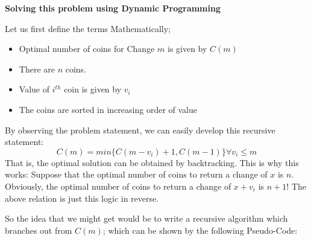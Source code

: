 \documentclass{article}
\theoremstyle{definition}
\theoremstyle{example}
\begin{document}
\noindent \textbf{Solving this problem using Dynamic Programming} \par
\noindent Let us first define the terms Mathematically;
\begin{itemize}
    \item Optimal number of coins for Change $m$ is given by $C(m)$
    \item There are $n$ coins.
    \item Value of $i^{th}$ coin is given by $v_i$
    \item The coins are sorted in increasing order of value
\end{itemize}
\noindent By observing the problem statement, we can easily develop this recursive statement:
\[C(m) = min\{C(m-v_i) + 1, C(m-1)\} \forall v_i \leq m\]
\hspace{4mm}That is, the optimal solution can be obtained by backtracking. This is why this works: Suppose that the optimal number of coins to return a change of $x$ is $n$. Obviously, the optimal number of coins to return a change of $x+v_i$ is $n+1$! The above relation is just this logic in reverse.\par
\vspace{4mm}
So the idea that we might get would be to write a recursive algorithm which branches out from $C(m)$; which can be shown by the following Pseudo-Code:\newpage
\end{document}
